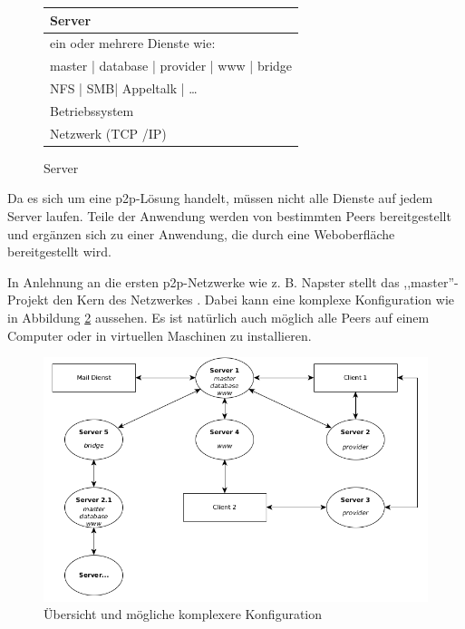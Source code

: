 \documentclass[oneside, ngerman, toc=bibliography,bibliography=totoc,listof=entryprefix, open=right,numbers=noenddot,fontsize=12pt]{scrbook}
\begin{document}
 \begin{figure}[htbp] 
     \centering 
     \begin{tabular}{|p{}|}
         \hline
         Server\\ \hline\hline
         ein oder mehrere Dienste wie:\\
         master  | database | provider | www | bridge\\ \hline\hline
         NFS | SMB| Appeltalk | \ldots \\ \hline
         Betriebssystem \\ \hline
         Netzwerk (TCP /IP) \\ \hline
        \end{tabular}
        
        \caption{Server}
        \label{fig:xist-server}
        
    \end{figure}   
    
 
Da es sich um eine \acrshort{p2p}-Lösung handelt, müssen nicht alle Dienste auf jedem Server laufen. 
Teile der Anwendung werden von bestimmten Peers bereitgestellt und ergänzen sich zu einer Anwendung, die durch eine Weboberfläche bereitgestellt wird.


In Anlehnung an die ersten \acrshort{p2p}-Netzwerke wie z. B. Napster stellt das ,,master''-Projekt den Kern des Netzwerkes \cite{mahlmann2007peer}.
Dabei kann eine komplexe Konfiguration wie in Abbildung \ref{fig:app-outline} aussehen. Es ist natürlich auch möglich alle Peers auf einem Computer oder in virtuellen Maschinen zu installieren.

\begin{figure}[htbp] 
    \centering
    \includegraphics[width=\textwidth]{Masterarbeit_Bilder/clients_uebersicht.png}
    \caption{Übersicht und mögliche komplexere Konfiguration}
    \label{fig:app-outline}
\end{figure}  
\end{document}
